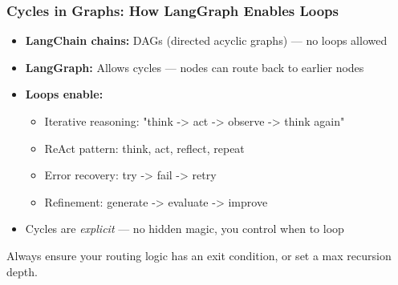 \documentclass[aspectratio=169,11pt]{beamer}
\begin{document}
\begin{frame}
\frametitle{Cycles in Graphs: How LangGraph Enables Loops}
\begin{itemize}
    \setlength{\itemsep}{1pt}
  \item \textbf{LangChain chains:} DAGs (directed acyclic graphs) — no loops allowed
  \item \textbf{LangGraph:} Allows cycles — nodes can route back to earlier nodes
  \item \textbf{Loops enable:}
    \begin{itemize}
    \setlength{\itemsep}{1pt}
      \item Iterative reasoning: "think -> act -> observe -> think again"
      \item ReAct pattern: think, act, reflect, repeat
      \item Error recovery: try -> fail -> retry
      \item Refinement: generate -> evaluate -> improve
    \end{itemize}
  \item Cycles are \textit{explicit} — no hidden magic, you control when to loop
\end{itemize}

\vspace{15pt}
\begin{warningbox}
Always ensure your routing logic has an exit condition, or set a max recursion depth.
\end{warningbox}
\end{frame}
\end{document}
